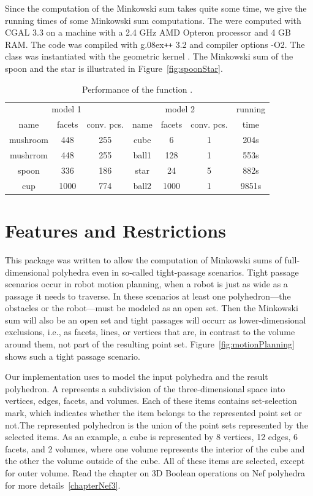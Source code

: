 Since the computation of the Minkowski sum takes quite some time, we
give the running times of some Minkowski sum computations. The were
computed with CGAL 3.3 on a machine with a 2.4 GHz AMD Opteron
processor and 4 GB RAM. The code was compiled with
{g\raise.08ex\hbox{\tt ++}} 3.2 and compiler options -O2. The
 class was instantiated with the geometric
kernel . The Minkowski sum of the spoon
and the star is illustrated in Figure~\ref{fig:spoonStar}.

\begin{table}[h]
\center
\begin{tabular}{|ccc|ccc|c|}
\hline
\multicolumn{3}{|c|}{model 1} & \multicolumn{3}{|c|}{model 2} & running \\
name & facets & conv. pcs. & name & facets & conv. pcs. & time \\ 
\hline
mushroom & 448 & 255 & cube & 6 & 1 & 204s \\
mushrrom & 448 & 255 & ball1 & 128 & 1 & 553s \\
spoon & 336 & 186 & star & 24 & 5 & 882s \\
cup & 1000 & 774 & ball2 & 1000 & 1 & 9851s \\
\hline
\end{tabular}
\caption{Performance of the function .}
\end{table}

\section{Features and Restrictions}
\label{sec:restrictions}

This package was written to allow the computation of Minkowski sums of
full-dimensional polyhedra even in so-called tight-passage scenarios.
Tight passage scenarios occur in robot motion planning, when a robot
is just as wide as a passage it needs to traverse. In these scenarios
at least one polyhedron---the obstacles or the robot---must be modeled
as an open set. Then the Minkowski sum will also be an open set and
tight passages will occurr as lower-dimensional exclusions, i.e., as
facets, lines, or vertices that are, in contrast to the volume around
them, not part of the resulting point
set. Figure~\ref{fig:motionPlanning} shows such a tight passage
scenario.

Our implementation uses  to model the input
polyhedra and the result polyhedron. A 
represents a subdivision of the three-dimensional space into vertices,
edges, facets, and volumes. Each of these items contains set-selection
mark, which indicates whether the item belongs to the represented
point set or not.The represented polyhedron is the union of the point
sets represented by the selected items. As an example, a cube is
represented by 8 vertices, 12 edges, 6 facets, and 2 volumes, where
one volume represents the interior of the cube and the other the
volume outside of the cube. All of these items are selected, except
for outer volume.  Read the chapter on 3D Boolean operations on Nef
polyhedra for more details~\ref{chapterNef3}.

